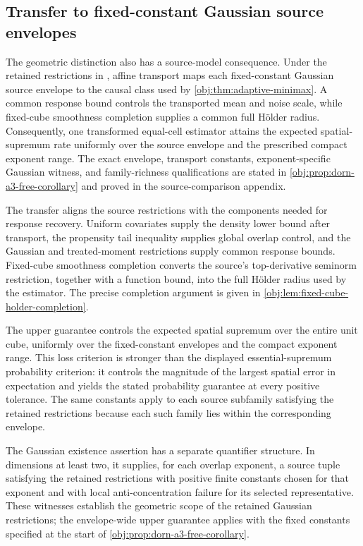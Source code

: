 \documentclass[11pt]{article}
\begin{document}
\subsection{Transfer to fixed-constant Gaussian source envelopes}

The geometric distinction also has a source-model consequence. Under the retained restrictions in \citet[Section 2, Assumptions 1--2, pp.~3--7]{Dorn2026GlobalOverlap}, affine transport maps each fixed-constant Gaussian source envelope to the causal class used by \cref{obj:thm:adaptive-minimax}. A common response bound controls the transported mean and noise scale, while fixed-cube smoothness completion supplies a common full Hölder radius. Consequently, one transformed equal-cell estimator attains the expected spatial-supremum rate uniformly over the source envelope and the prescribed compact exponent range. The exact envelope, transport constants, exponent-specific Gaussian witness, and family-richness qualifications are stated in \cref{obj:prop:dorn-a3-free-corollary} and proved in the source-comparison appendix.



The transfer aligns the source restrictions with the components needed for response recovery. Uniform covariates supply the density lower bound after transport, the propensity tail inequality supplies global overlap control, and the Gaussian and treated-moment restrictions supply common response bounds. Fixed-cube smoothness completion converts the source's top-derivative seminorm restriction, together with a function bound, into the full Hölder radius used by the estimator. The precise completion argument is given in \cref{obj:lem:fixed-cube-holder-completion}.

The upper guarantee controls the expected spatial supremum over the entire unit cube, uniformly over the fixed-constant envelopes and the compact exponent range. This loss criterion is stronger than the displayed essential-supremum probability criterion: it controls the magnitude of the largest spatial error in expectation and yields the stated probability guarantee at every positive tolerance. The same constants apply to each source subfamily satisfying the retained restrictions because each such family lies within the corresponding envelope.

The Gaussian existence assertion has a separate quantifier structure. In dimensions at least two, it supplies, for each overlap exponent, a source tuple satisfying the retained restrictions with positive finite constants chosen for that exponent and with local anti-concentration failure for its selected representative. These witnesses establish the geometric scope of the retained Gaussian restrictions; the envelope-wide upper guarantee applies with the fixed constants specified at the start of \cref{obj:prop:dorn-a3-free-corollary}.
\end{document}
